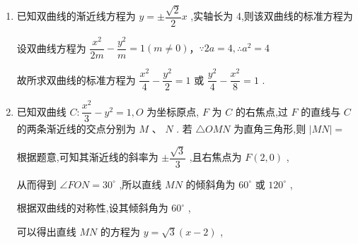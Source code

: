 \begin{enumerate}
\begin{enumerate}
\begin{enumerate}
            \begin{jieda}
                由题可设双曲线方程为 $4{x}^{2} - {y}^{2} = \lambda \left( {\lambda  \neq  0}\right)$ 
                
                由双曲线经过点 $\left( {1,\sqrt{3}}\right)$，代入得$\lambda  = 4 \times  {1}^{2} - {\left( \sqrt{3}\right) }^{2} = 1$
                
                因此双曲线方程为 $4{x}^{2} - {y}^{2} = 1$ .
            \end{jieda}
            \item 已知双曲线的渐近线方程为 $y =  \pm  \dfrac{\sqrt{2}}{2}x$ ,实轴长为 4,则该双曲线的标准方程为
            \begin{jieda}
                设双曲线方程为 $\dfrac{{x}^{2}}{2m} - \dfrac{{y}^{2}}{m} = 1\left( {m \neq  0}\right)$，$\because {2a} = 4,\therefore {a}^{2} = 4$ 
                
                故所求双曲线的标准方程为 $\dfrac{{x}^{2}}{4} - \dfrac{{y}^{2}}{2} = 1$ 或 $\dfrac{{y}^{2}}{4} - \dfrac{{x}^{2}}{8} = 1$ .
            \end{jieda}

            \item 已知双曲线 $C : \dfrac{{x}^{2}}{3} - {y}^{2} = 1,O$ 为坐标原点, $F$ 为 $C$ 的右焦点,过 $F$ 的直线与 $C$ 的两条渐近线的交点分别为 $M\text{ 、 }N$ . 若 $\bigtriangleup {OMN}$ 为直角三角形,则 $\left| {MN}\right|  =$ 
            \begin{jieda}
                根据题意,可知其渐近线的斜率为 $\pm  \dfrac{\sqrt{3}}{3}$ ,且右焦点为 $F\left( {2,0}\right)$ ,
                
                从而得到 $\angle {FON} = {30}^{ \circ  }$ ,所以直线 ${MN}$ 的倾斜角为 ${60}^{ \circ  }$ 或 ${120}^{ \circ  }$ ,
                
                根据双曲线的对称性,设其倾斜角为 ${60}^{ \circ  }$ ,
                
                可以得出直线 ${MN}$ 的方程为 $y = \sqrt{3}\left( {x - 2}\right)$ ,
                

\end{jieda}
\end{enumerate}
\end{enumerate}
\end{enumerate}
